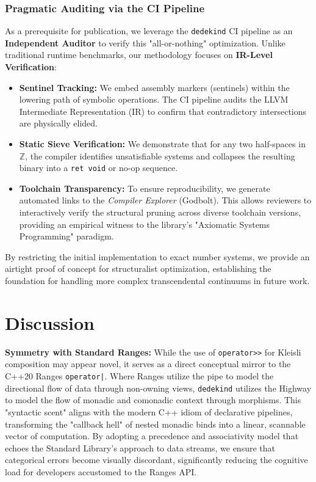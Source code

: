 \documentclass[11pt, a4paper]{report}
\begin{document}
\subsection{Pragmatic Auditing via the CI Pipeline}

As a prerequisite for publication, we leverage the \texttt{dedekind} CI pipeline as an \textbf{Independent Auditor} to verify this "all-or-nothing" optimization. Unlike traditional runtime benchmarks, our methodology focuses on \textbf{IR-Level Verification}:

\begin{itemize}
    \item \textbf{Sentinel Tracking:} We embed assembly markers (sentinels) within the lowering path of symbolic operations. The CI pipeline audits the LLVM Intermediate Representation (IR) to confirm that contradictory intersections are physically elided.
    \item \textbf{Static Sieve Verification:} We demonstrate that for any two half-spaces in $\mathbb{Z}$, the compiler identifies unsatisfiable systems and collapses the resulting binary into a \texttt{ret void} or no-op sequence.
    \item \textbf{Toolchain Transparency:} To ensure reproducibility, we generate automated links to the \textit{Compiler Explorer} (Godbolt). This allows reviewers to interactively verify the structural pruning across diverse toolchain versions, providing an empirical witness to the library's "Axiomatic Systems Programming" paradigm.
\end{itemize}

By restricting the initial implementation to exact number systems, we provide an airtight proof of concept for structuralist optimization, establishing the foundation for handling more complex transcendental continuums in future work.


\chapter{Discussion}
\label{chap:discussion}

\textbf{Symmetry with Standard Ranges:} While the use of \texttt{operator>>} for Kleisli composition may appear novel, it serves as a direct conceptual mirror to the C++20 Ranges \texttt{operator|}. Where Ranges utilize the pipe to model the directional flow of data through non-owning views, \texttt{dedekind} utilizes the Highway to model the flow of monadic and comonadic context through morphisms. This "syntactic scent" aligns with the modern C++ idiom of declarative pipelines, transforming the "callback hell" of nested monadic binds into a linear, scannable vector of computation. By adopting a precedence and associativity model that echoes the Standard Library's approach to data streams, we ensure that categorical errors become visually discordant, significantly reducing the cognitive load for developers accustomed to the Ranges API.
\end{document}
